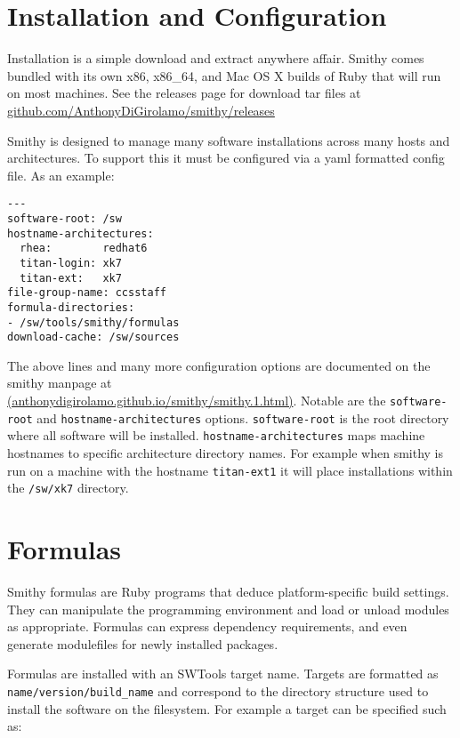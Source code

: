 \documentclass{acm_proc_article-sp}
\begin{document}
\section{Installation and Configuration}

Installation is a simple download and extract anywhere affair. Smithy comes
bundled with its own x86, x86\_64, and Mac OS X builds of Ruby that will run on
most machines.  See the releases page for download tar files at \\
\href{http://github.com/AnthonyDiGirolamo/smithy/releases}{github.com/AnthonyDiGirolamo/smithy/releases}

Smithy is designed to manage many software installations across many hosts and
architectures. To support this it must be configured via a yaml formatted config
file. As an example:

\begin{quoting}
\begin{verbatim}
---
software-root: /sw
hostname-architectures:
  rhea:        redhat6
  titan-login: xk7
  titan-ext:   xk7
file-group-name: ccsstaff
formula-directories:
- /sw/tools/smithy/formulas
download-cache: /sw/sources
\end{verbatim}
\end{quoting}

The above lines and many more configuration options are documented on the smithy
manpage at \\
\href{http://anthonydigirolamo.github.io/smithy/smithy.1.html}{(anthonydigirolamo.github.io/smithy/smithy.1.html)}.
Notable are the \texttt{software-root} and \texttt{hostname-architectures}
options. \texttt{software-root} is the root directory where all software will be
installed. \texttt{hostname-architectures} maps machine hostnames to specific
architecture directory names. For example when smithy is run on a machine with
the hostname \texttt{titan-ext1} it will place installations within the
\texttt{/sw/xk7} directory.

\section{Formulas}

Smithy formulas are Ruby programs that deduce platform-specific build settings.
They can manipulate the programming environment and load or unload modules as
appropriate. Formulas can express dependency requirements, and even generate
modulefiles for newly installed packages.

Formulas are installed with an SWTools target name. Targets are formatted as
\texttt{name/version/build\_name} and correspond to the directory structure used
to install the software on the filesystem.  For example a target can be
specified such as:
\end{document}

